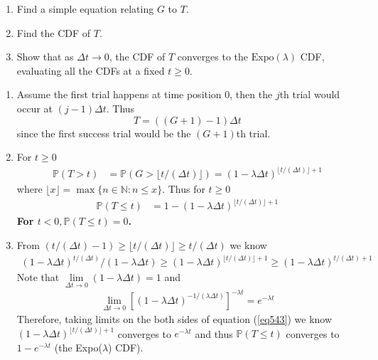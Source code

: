 \begin{exercise}[BH.5.43]
	\begin{enumerate}
		\item Find a simple equation relating $G$ to $T$.
		\item Find the CDF of $T$.
		\item Show that as $\Delta t \to 0$, the CDF of $T$ converges to the $\text{Expo}(\lambda)$ CDF, evaluating all the CDFs at a fixed $t \geq 0$.
	\end{enumerate}
\begin{solution}
    \begin{enumerate}
	    \item Assume the first trial happens at time position $0$, then the $j$th trial would occur at $(j-1)\Delta t$. Thus
    	\[T=((G+1) - 1)\Delta t\] 
    	since the first success trial would be the $(G+1)$th trial.  
    	\item For $t\geq 0$
    	\begin{align*}
    		\mathbb{P}\left(T>t\right) &= \mathbb{P}\left(G> \lfloor t /(\Delta t)\rfloor \right) = \left( 1-\lambda \Delta t \right)^{\lfloor t /(\Delta t)\rfloor +1 }
    	\end{align*}
    	where $\lfloor x \rfloor = \max\{n \in \mathbb{N}: n\leq x \}$. Thus for $t\geq 0$
    	\begin{align*}
    		\mathbb{P}\left(T\leq t\right) &= 1- \left( 1-\lambda \Delta t \right)^{\lfloor t /(\Delta t)\rfloor +1 }
    	\end{align*}
    	\textbf{For $t<0, \mathbb{P}\left(T\leq t\right)=0$.
    	}
        \item From 
    	$\left(t /(\Delta t) -1 \right)\geq \lfloor t /(\Delta t)\rfloor \geq t /(\Delta t)$
    	we know 
    	\begin{align}
    		\left( 1-\lambda \Delta t \right)^{  t /(\Delta t) }/\left( 1-\lambda \Delta t \right) \geq \left( 1-\lambda \Delta t \right)^{\lfloor t /(\Delta t)\rfloor +1 } \geq \left( 1-\lambda \Delta t \right)^{ t /(\Delta t) +1} \label{eq543}
    	\end{align}
    	Note that $\lim\limits_{\Delta t\rightarrow 0}\left( 1-\lambda \Delta t \right)=1$ and 
    	\begin{align*}
    		\lim\limits_{\Delta t\rightarrow 0}\left[\left( 1-\lambda \Delta t \right)^{ -1 /(\lambda \Delta t) }\right]^{-\lambda t} = e^{-\lambda t}
    	\end{align*}
    	Therefore, taking limits on the both sides of equation (\ref{eq543}) we know $ \left( 1-\lambda \Delta t \right)^{\lfloor t /(\Delta t)\rfloor +1 }$ converges to $e^{-\lambda t}$ and thus $\mathbb{P}(T\leq t)$ converges to $1-e^{-\lambda t}$ (the Expo($\lambda$) CDF). 
	\end{enumerate}
\end{solution}
\end{exercise}


